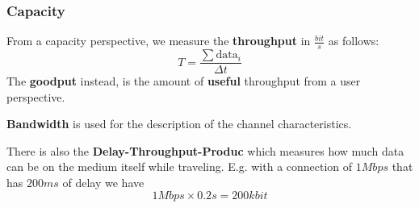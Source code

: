 \subsubsection{Capacity}
From a capacity perspective, we measure the \textbf{throughput} in $\frac{bit}{s}$ as follows:
\begin{equation}
	T=\frac{\sum \text{data}_i}{\Delta t}
\end{equation}
The \textbf{goodput} instead, is the amount of \textbf{useful} throughput from a user perspective.

\begin{note}
	\textbf{Bandwidth} is used for the description of the channel characteristics.
\end{note}

There is also the \textbf{Delay-Throughput-Produc} which measures how much data can be on the medium itself while traveling. E.g. with a connection of $1Mbps$ that has $200 ms$ of delay we have 
\begin{equation*}
	1 Mbps \times 0.2s = 200kbit
\end{equation*}